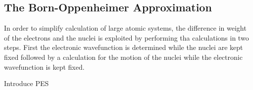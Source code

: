 \subsection{The Born-Oppenheimer Approximation}
\label{sec:born-oppenheimer}

In order to simplify calculation of large atomic systems, the difference in weight of the electrons and the nuclei is exploited by performing tha calculations in two steps.
First the electronic wavefunction is determined while the nuclei are kept fixed followed by a calculation for the motion of the nuclei while the electronic wavefunction is kept fixed.

\bit
\item Introduce PES
\eit

\incomplete
